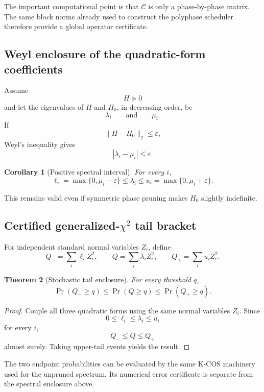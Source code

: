 \documentclass[11pt]{article}
\newtheorem{theorem}{Theorem}[section]
\newtheorem{corollary}[theorem]{Corollary}
\theoremstyle{definition}
\theoremstyle{remark}
\begin{document}
The important computational point is that \(\mathcal C\) is only a
phase-by-phase matrix.  The same block norms already used to construct the
polyphase scheduler therefore provide a global operator certificate.

\subsection{Weyl enclosure of the quadratic-form coefficients}

Assume
\[
H\succeq0
\]
and let the eigenvalues of \(H\) and \(H_0\), in decreasing order, be
\[
\lambda_i
\qquad\text{and}\qquad
\mu_i.
\]
If
\[
\|H-H_0\|_2\le\varepsilon,
\]
Weyl's inequality gives
\[
|\lambda_i-\mu_i|\le\varepsilon.
\]

\begin{corollary}[Positive spectral interval]\label{claim:final-22-2}
For every \(i\),
\[
\boxed{
\ell_i
=
\max\{0,\mu_i-\varepsilon\}
\le
\lambda_i
\le
u_i
=
\max\{0,\mu_i+\varepsilon\}.
}
\]
\end{corollary}

This remains valid even if symmetric phase pruning makes \(H_0\) slightly
indefinite.

\subsection{Certified generalized-\texorpdfstring{\(\chi^2\)}{chi-square} tail bracket}

For independent standard normal variables \(Z_i\), define
\[
Q_-=\sum_i\ell_iZ_i^2,
\qquad
Q=\sum_i\lambda_iZ_i^2,
\qquad
Q_+=\sum_i u_iZ_i^2.
\]

\begin{theorem}[Stochastic tail enclosure]\label{claim:final-22-3}
For every threshold \(q\),
\[
\boxed{
\Pr(Q_-\ge q)
\le
\Pr(Q\ge q)
\le
\Pr(Q_+\ge q).
}
\]
\end{theorem}

\begin{proof}
Couple all three quadratic forms using the same normal variables \(Z_i\).
Since
\[
0\le\ell_i\le\lambda_i\le u_i
\]
for every \(i\),
\[
Q_-\le Q\le Q_+
\]
almost surely.  Taking upper-tail events yields the result.
\end{proof}

The two endpoint probabilities can be evaluated by the same K-COS machinery
used for the unpruned spectrum.  Its numerical error certificate is separate
from the spectral enclosure above.
\end{document}
